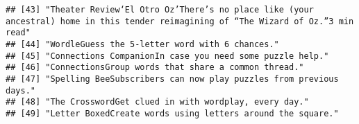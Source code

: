 \documentclass[
]{article}
\begin{document}
\begin{verbatim}
## [43] "Theater Review‘El Otro Oz’There’s no place like (your ancestral) home in this tender reimagining of “The Wizard of Oz.”3 min read"                                                                                                                                                                                                                                                                                    
## [44] "WordleGuess the 5-letter word with 6 chances."                                                                                                                                                                                                                                                                                                                                                                        
## [45] "Connections CompanionIn case you need some puzzle help."                                                                                                                                                                                                                                                                                                                                                              
## [46] "ConnectionsGroup words that share a common thread."                                                                                                                                                                                                                                                                                                                                                                   
## [47] "Spelling BeeSubscribers can now play puzzles from previous days."                                                                                                                                                                                                                                                                                                                                                     
## [48] "The CrosswordGet clued in with wordplay, every day."                                                                                                                                                                                                                                                                                                                                                                  
## [49] "Letter BoxedCreate words using letters around the square."
\end{verbatim}
\end{document}
